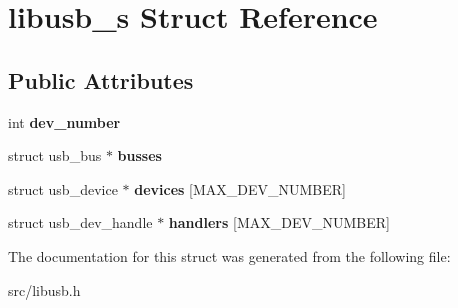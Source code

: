 \hypertarget{structlibusb__s}{
\section{libusb\_\-s Struct Reference}
\label{structlibusb__s}
}
\subsection*{Public Attributes}
\begin{DoxyCompactItemize}
\item 
\hypertarget{structlibusb__s_a4238b80223b220fc109a53df0ec65f83}{
int {\bfseries dev\_\-number}}
\label{structlibusb__s_a4238b80223b220fc109a53df0ec65f83}

\item 
\hypertarget{structlibusb__s_a5f2b9a34f8a72a63e0199cd765b7f60b}{
struct usb\_\-bus $\ast$ {\bfseries busses}}
\label{structlibusb__s_a5f2b9a34f8a72a63e0199cd765b7f60b}

\item 
\hypertarget{structlibusb__s_ad755aa0aeb18fdc27470dd32ac0fae19}{
struct usb\_\-device $\ast$ {\bfseries devices} \mbox{[}MAX\_\-DEV\_\-NUMBER\mbox{]}}
\label{structlibusb__s_ad755aa0aeb18fdc27470dd32ac0fae19}

\item 
\hypertarget{structlibusb__s_a518dcc983275e91a2d61c07153f32b53}{
struct usb\_\-dev\_\-handle $\ast$ {\bfseries handlers} \mbox{[}MAX\_\-DEV\_\-NUMBER\mbox{]}}
\label{structlibusb__s_a518dcc983275e91a2d61c07153f32b53}

\end{DoxyCompactItemize}


The documentation for this struct was generated from the following file:\begin{DoxyCompactItemize}
\item 
src/libusb.h\end{DoxyCompactItemize}
